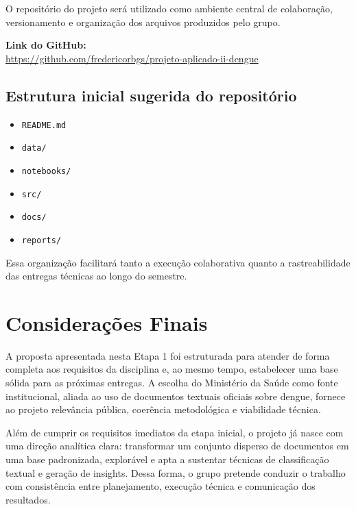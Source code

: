\documentclass[12pt,a4paper]{article}
\begin{document}
O repositório do projeto será utilizado como ambiente central de colaboração, versionamento e organização dos arquivos produzidos pelo grupo.

\textbf{Link do GitHub:}\\
\url{https://github.com/fredericorbgs/projeto-aplicado-ii-dengue}

\subsection{Estrutura inicial sugerida do repositório}

\begin{itemize}[leftmargin=1.2cm]
    \item \texttt{README.md}
    \item \texttt{data/}
    \item \texttt{notebooks/}
    \item \texttt{src/}
    \item \texttt{docs/}
    \item \texttt{reports/}
\end{itemize}

Essa organização facilitará tanto a execução colaborativa quanto a rastreabilidade das entregas técnicas ao longo do semestre.

\clearpage
\section{Considerações Finais}

A proposta apresentada nesta Etapa 1 foi estruturada para atender de forma completa aos requisitos da disciplina e, ao mesmo tempo, estabelecer uma base sólida para as próximas entregas. A escolha do Ministério da Saúde como fonte institucional, aliada ao uso de documentos textuais oficiais sobre dengue, fornece ao projeto relevância pública, coerência metodológica e viabilidade técnica.

Além de cumprir os requisitos imediatos da etapa inicial, o projeto já nasce com uma direção analítica clara: transformar um conjunto disperso de documentos em uma base padronizada, explorável e apta a sustentar técnicas de classificação textual e geração de insights. Dessa forma, o grupo pretende conduzir o trabalho com consistência entre planejamento, execução técnica e comunicação dos resultados.

\vspace{1cm}

\clearpage

\end{document}
